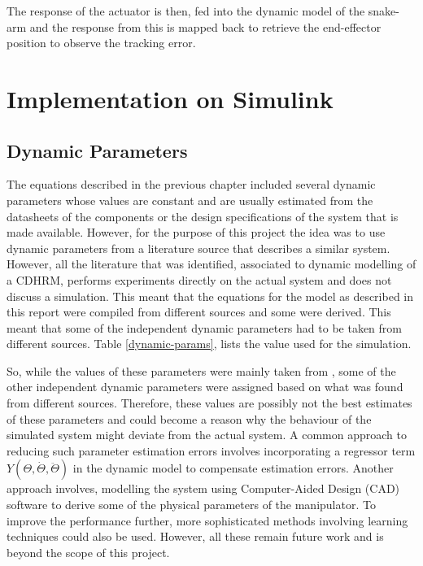 \documentclass[a4paper,12pt]{report}
\begin{document}
The response of the actuator is then, fed into the dynamic model of the snake-arm and the response from this is mapped back to retrieve the end-effector position to observe the tracking error.


\section{Implementation on Simulink}

\subsection{Dynamic Parameters}
\label{section:dynamic-params}
The equations described in the previous chapter included several dynamic parameters whose values are constant and are usually estimated from the datasheets of the components or the design specifications of the system that is made available. However, for the purpose of this project the idea was to use dynamic parameters from a literature source that describes a similar system. However, all the literature that was identified, associated to dynamic modelling of a CDHRM, performs experiments directly on the actual system and does not discuss a simulation. This meant that the equations for the model as described in this report were compiled from different sources and some were derived. This meant that some of the independent dynamic parameters had to be taken from different sources. Table \ref{dynamic-params}, lists the value used for the simulation.

So, while the values of these parameters were mainly taken from \cite{RN30}, some of the other independent dynamic parameters were assigned based on what was found from different sources. Therefore, these values are possibly not the best estimates of these parameters and could become a reason why the behaviour of the simulated system might deviate from the actual system. A common approach to reducing such parameter estimation errors involves incorporating a regressor term $ Y(\Theta,\dot{\Theta},\ddot{\Theta}) $ in the dynamic model to compensate estimation errors. Another approach involves, modelling the system using Computer-Aided Design (CAD) software to derive some of the physical parameters of the manipulator. To improve the performance further, more sophisticated methods involving learning techniques could also be used. However, all these remain future work and is beyond the scope of this project.
\end{document}
